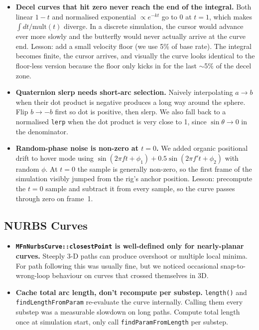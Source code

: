 \documentclass[12pt]{article}
\begin{document}
\begin{itemize}
  \item \textbf{Decel curves that hit zero never reach the end of the
    integral.}  Both linear $1{-}t$ and normalised exponential
    $\propto e^{-kt}$ go to 0 at $t{=}1$, which makes
    $\int dt/\text{mult}(t)$ diverge.  In a discrete simulation, the
    cursor would advance ever more slowly and the butterfly would never
    actually arrive at the curve end.  Lesson: add a small velocity floor
    (we use 5\% of base rate).  The integral becomes finite, the cursor
    arrives, and visually the curve looks identical to the floor-less
    version because the floor only kicks in for the last $\sim$5\% of the
    decel zone.

  \item \textbf{Quaternion slerp needs short-arc selection.}  Naively
    interpolating $a \to b$ when their dot product is negative produces a
    long way around the sphere.  Flip $b \to -b$ first so dot is positive,
    then slerp.  We also fall back to a normalised \texttt{lerp} when the
    dot product is very close to 1, since $\sin\theta \to 0$ in the
    denominator.

  \item \textbf{Random-phase noise is non-zero at $t{=}0$.}  We added
    organic positional drift to hover mode using
    $\sin(2\pi f t + \phi_1) + 0.5\sin(2\pi f' t + \phi_2)$ with random
    $\phi$.  At $t{=}0$ the sample is generally non-zero, so the first
    frame of the simulation visibly jumped from the rig's anchor position.
    Lesson: precompute the $t{=}0$ sample and subtract it from every
    sample, so the curve passes through zero on frame~1.
\end{itemize}

\subsection*{NURBS Curves}

\begin{itemize}
  \item \textbf{\texttt{MFnNurbsCurve::closestPoint} is well-defined only
    for nearly-planar curves.}  Steeply 3-D paths can produce overshoot or
    multiple local minima.  For path following this was usually fine, but
    we noticed occasional snap-to-wrong-loop behaviour on curves that
    crossed themselves in 3D.

  \item \textbf{Cache total arc length, don't recompute per substep.}
    \texttt{length()} and \texttt{findLengthFromParam} re-evaluate the
    curve internally.  Calling them every substep was a measurable
    slowdown on long paths.  Compute total length once at simulation
    start, only call \texttt{findParamFromLength} per substep.
\end{itemize}
\end{document}
